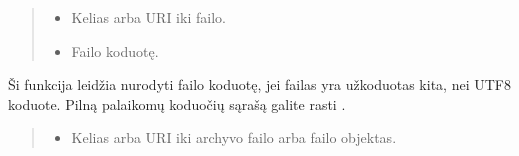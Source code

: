 \documentclass[letterpaper,10pt,lithuanian]{sphinxmanual}
\begin{document}
\begin{fulllineitems}

\pysigstartsignatures
{}
\pysigstopsignatures{}

\begin{fulllineitems}
\label{\detokenize{formules:func.file}}
\pysigstartsignatures
{}
\pysigstopsignatures\begin{quote}\begin{description}
\begin{itemize}
\item {} 
\sphinxAtStartPar
{} \sphinxhyphen{}\sphinxhyphen{} Kelias arba URI iki failo.

\item {} 
\sphinxAtStartPar
{} \sphinxhyphen{}\sphinxhyphen{} Failo koduotę.

\end{itemize}

\end{description}\end{quote}

\sphinxAtStartPar
Ši funkcija leidžia nurodyti failo koduotę, jei failas yra užkoduotas
kita, nei UTF\sphinxhyphen{}8 koduote. Pilną palaikomų koduočių sąrašą galite rasti
.

\end{fulllineitems}


\begin{fulllineitems}
\label{\detokenize{formules:func.extract}}
\pysigstartsignatures
{}
\pysigstopsignatures\begin{quote}\begin{description}
\begin{itemize}
\item {} 
\sphinxAtStartPar
{} \sphinxhyphen{}\sphinxhyphen{} Kelias arba URI iki archyvo failo arba failo objektas.


\end{itemize}
\end{description}
\end{quote}
\end{fulllineitems}
\end{fulllineitems}
\end{document}
